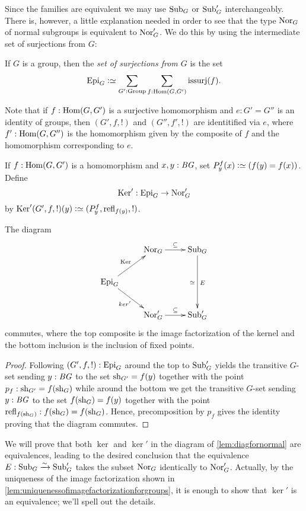 Since the families are equivalent we may use $\mathrm{Sub}_G$ or $\mathrm{Sub}_G'$ interchangeably.  
There is, however, a little explanation needed in order to see that the type $\mathrm{Nor}_G$ of normal subgroups is equivalent to $\mathrm{Nor}'_G$.
We do this by using the intermediate set of surjections from $G$:
\begin{definition}
  \label{def:typeepi}
  If $G$ is a group, then the \emph{set of surjections from $G$} is the set
$$\typeepi_G\defequi\sum_{G':\typegroup}\sum_{f:\Hom(G,G')}\mathrm{issurj}(f).$$
\end{definition}
Note that if $f:\Hom(G,G')$ is a surjective homomorphism and $e:G'=G''$ is an identity of groups, then $(G',f,!)$ and $(G'',f',!)$ are identitified via $e$, where $f':\Hom(G,G'')$ is the homomorphism given by the composite of $f$ and the homomorphism corresponding to $e$.

\begin{definition}
  \label{def:ker2}
  If $f:\Hom(G,G')$ is a homomorphism and $x,y:\mathit{B}\mathit{G}$, set $P^f_y(x)\defequi (f(y)=f(x))$.
  Define $$\ker':\typeepi_G\to\typenormal_G'$$
  by $\ker'(G',f,!)(y)\defequi(P^f_y,\refl{f(y)},!)$.
\end{definition}

\begin{lemma}
  \label{lem:diagfornormal}
  The diagram
  $$\xymatrix{
  &\typenormal_G\ar[r]^{\subseteq}&\typesubgroup_G\ar[dd]_{\simeq}^{E}\\
  \typeepi_G\ar[ur]^{\ker}\ar[dr]_{ker'}&&\\
  &\typenormal_G'\ar[r]^{\subseteq}&\typesubgroup_G'}
$$
commutes, where the top composite is the image factorization of the kernel and the bottom inclusion is the inclusion of fixed points.
\end{lemma}
\begin{proof}
  Following $(G',f,!):\mathrm{Epi}_G$ around the top to $\mathrm{Sub}_G'$ yields the transitive $G$-set sending $y:\mathit{B}\mathit{G}$ to the set $\mathrm{sh}_{G'}=f(y)$ together with the point $p_f:\mathrm{sh}_{G'}=f(\mathrm{sh}_G)$ while around the bottom we get the transitive $G$-set sending $y:\mathit{B}\mathit{G}$ to the set $f(\mathrm{sh}_G)=f(y)$ together with the point $\mathrm{refl}_{f(\mathrm{sh}_G)}:f(\mathrm{sh}_G)=f(\mathrm{sh}_G)$.  Hence, precomposition by $p_f$ gives the identity proving that the diagram commutes. 
\end{proof}
We will prove that both $\ker$ and $\ker'$ in the diagram of \cref{lem:diagfornormal} are equivalences, leading to the desired conclusion that the equivalence $E:\mathrm{Sub}_G\xrightarrow{\sim}\mathrm{Sub}_G'$ takes the subset $\mathrm{Nor}_G$ identically to $\mathrm{Nor}_G'$.  Actually, by the uniqueness of the image factorization shown in \cref{lem:uniquenessofimagefactorizationforgroups}, it is enough to show that $\ker'$ is an equivalence; we'll spell out the details.

